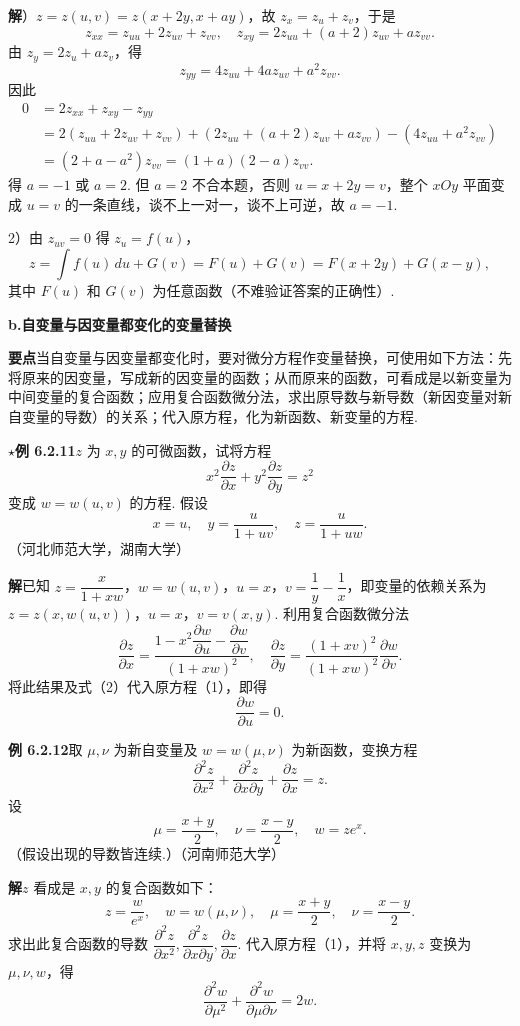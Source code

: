 \documentclass[UTF8,12pt,a4paper,fontset=fandol]{ctexart}
\begin{document}
\noindent\textbf{解}）$z=z(u,v)=z(x+2y,x+ay)$，故 $z_x=z_u+z_v$，于是
\[
  z_{xx}=z_{uu}+2z_{uv}+z_{vv},\quad
  z_{xy}=2z_{uu}+(a+2)z_{uv}+az_{vv}.
\]
由 $z_y=2z_u+az_v$，得
\[
  z_{yy}=4z_{uu}+4az_{uv}+a^2z_{vv}.
\]
因此
\[
\begin{aligned}
0&=2z_{xx}+z_{xy}-z_{yy}\\
&=2(z_{uu}+2z_{uv}+z_{vv})+(2z_{uu}+(a+2)z_{uv}+az_{vv})-(4z_{uu}+a^2z_{vv})\\
&=(2+a-a^2)z_{vv}=(1+a)(2-a)z_{vv}.
\end{aligned}
\]
得 $a=-1$ 或 $a=2$. 但 $a=2$ 不合本题，否则 $u=x+2y=v$，整个 $xOy$ 平面变成 $u=v$ 的一条直线，谈不上一对一，谈不上可逆，故 $a=-1$.

2）由 $z_{uv}=0$ 得 $z_u=f(u)$，
\[
  z=\int f(u)\,du+G(v)=F(u)+G(v)=F(x+2y)+G(x-y),
\]
其中 $F(u)$ 和 $G(v)$ 为任意函数（不难验证答案的正确性）.

\noindent\textbf{b.\quad 自变量与因变量都变化的变量替换}

\noindent\textbf{要点}\quad 当自变量与因变量都变化时，要对微分方程作变量替换，可使用如下方法：先将原来的因变量，写成新的因变量的函数；从而原来的函数，可看成是以新变量为中间变量的复合函数；应用复合函数微分法，求出原导数与新导数（新因变量对新自变量的导数）的关系；代入原方程，化为新函数、新变量的方程.

\noindent\textbf{\ensuremath{\star}例 6.2.11}\quad $z$ 为 $x,y$ 的可微函数，试将方程
\[
  x^2\frac{\partial z}{\partial x}+y^2\frac{\partial z}{\partial y}=z^2 \tag{1}
\]
变成 $w=w(u,v)$ 的方程. 假设
\[
  x=u,\quad y=\frac{u}{1+uv},\quad z=\frac{u}{1+uw}. \tag{2}
\]
（河北师范大学，湖南大学）

\noindent\textbf{解}\quad 已知 $z=\dfrac{x}{1+xw}$，$w=w(u,v)$，$u=x$，$v=\dfrac1y-\dfrac1x$，即变量的依赖关系为 $z=z(x,w(u,v))$，$u=x$，$v=v(x,y)$.
利用复合函数微分法
\[
  \frac{\partial z}{\partial x}
  =\frac{1-x^2\dfrac{\partial w}{\partial u}-\dfrac{\partial w}{\partial v}}{(1+xw)^2},\quad
  \frac{\partial z}{\partial y}
  =\frac{(1+xv)^2}{(1+xw)^2}\frac{\partial w}{\partial v}.
\]
将此结果及式（2）代入原方程（1），即得
\[
  \frac{\partial w}{\partial u}=0.
\]

\noindent\textbf{例 6.2.12}\quad 取 $\mu,\nu$ 为新自变量及 $w=w(\mu,\nu)$ 为新函数，变换方程
\[
  \frac{\partial^2z}{\partial x^2}+\frac{\partial^2z}{\partial x\partial y}+\frac{\partial z}{\partial x}=z. \tag{1}
\]
设
\[
  \mu=\frac{x+y}{2},\quad \nu=\frac{x-y}{2},\quad w=ze^x. \tag{2}
\]
（假设出现的导数皆连续.）（河南师范大学）

\noindent\textbf{解}\quad $z$ 看成是 $x,y$ 的复合函数如下：
\[
  z=\frac{w}{e^x},\quad w=w(\mu,\nu),\quad \mu=\frac{x+y}{2},\quad \nu=\frac{x-y}{2}.
\]
求出此复合函数的导数 $\dfrac{\partial^2z}{\partial x^2},\dfrac{\partial^2z}{\partial x\partial y},\dfrac{\partial z}{\partial x}$. 代入原方程（1），并将 $x,y,z$ 变换为 $\mu,\nu,w$，得
\[
  \frac{\partial^2w}{\partial \mu^2}+\frac{\partial^2w}{\partial \mu\partial\nu}=2w.
\]
\end{document}
